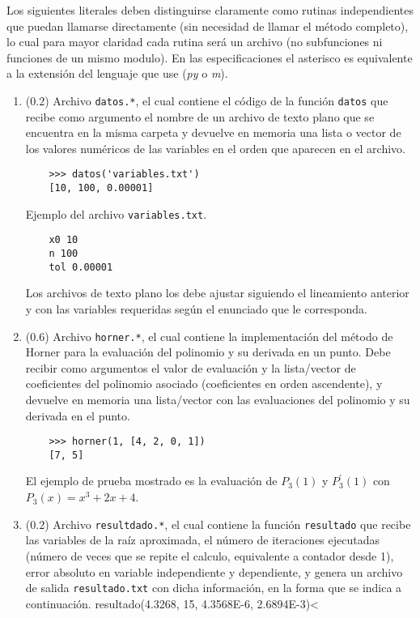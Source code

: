 \documentclass[12pt]{article}
\begin{document}
\begin{enumerate}[leftmargin=*,widest=9]
Los siguientes literales deben distinguirse claramente como rutinas independientes que puedan llamarse directamente (sin necesidad de llamar el método completo), lo cual para mayor claridad cada rutina será un archivo (no subfunciones ni funciones de un mismo modulo). En las especificaciones el asterisco es equivalente a la extensión del lenguaje que use (\textit{py} o \textit{m}).
    \begin{enumerate}[label=\alph*]
    \item (\(0.2\)) Archivo \verb-datos.*-, el cual contiene el código de la función \verb-datos- que recibe como argumento el nombre de un archivo de texto plano que se encuentra en la misma carpeta y devuelve en memoria una lista o vector de los valores numéricos de las variables en el orden que aparecen en el archivo.
    \begin{verbatim}
    >>> datos('variables.txt')
    [10, 100, 0.00001]
    \end{verbatim}
    Ejemplo del archivo \verb-variables.txt-.
    \begin{verbatim}
    x0 10
    n 100
    tol 0.00001
    \end{verbatim}
Los archivos de texto plano los debe ajustar siguiendo el lineamiento anterior y con las variables requeridas según el enunciado que le corresponda.
    \item (\(0.6\)) Archivo \verb-horner.*-, el cual contiene la implementación del método de Horner para la evaluación del polinomio y su derivada en un punto. Debe recibir como argumentos el valor de evaluación y la lista/vector de coeficientes del polinomio asociado (coeficientes en orden ascendente), y devuelve en memoria una lista/vector con las evaluaciones del polinomio y su derivada en el punto.
    \begin{verbatim}
    >>> horner(1, [4, 2, 0, 1])
    [7, 5]
    \end{verbatim}
El ejemplo de prueba mostrado es la evaluación de \(P_3(1)\) y \(P_3^\prime (1)\) con \(P_3(x) = x^3 + 2x +4\).
    \item (\(0.2\)) Archivo \verb-resultdado.*-, el cual contiene la función \verb-resultado- que recibe las variables de la raíz aproximada, el número de iteraciones ejecutadas (número de veces que se repite el calculo, equivalente a contador desde 1), error absoluto en variable independiente y dependiente, y genera un archivo de salida \verb-resultado.txt- con dicha información, en la forma que se indica a continuación.
    \verb<    >>> resultado(4.3268, 15, 4.3568E-6, 2.6894E-3)<

\end{enumerate}
\end{enumerate}
\end{document}
